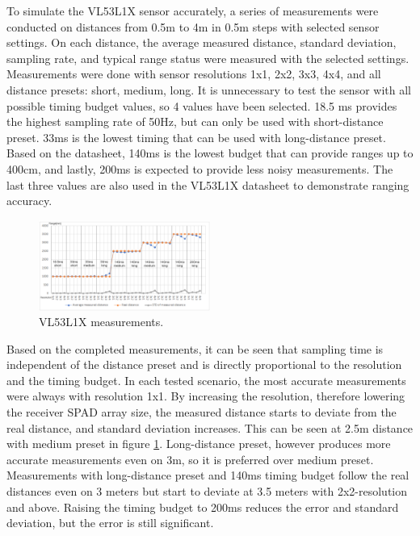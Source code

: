 \documentclass[conference]{IEEEtran}
\begin{document}
To simulate the VL53L1X sensor accurately, a series of measurements were conducted on distances from 0.5m to 4m
in 0.5m steps with selected sensor settings. On each distance, the average measured distance, standard deviation,
sampling rate, and typical range status were measured with the selected settings. Measurements were done with 
sensor resolutions 1x1, 2x2, 3x3, 4x4, and all distance presets: short, medium, long. It is unnecessary to test
the sensor with all possible timing budget values, so 4 values have been selected.
18.5 ms provides the highest sampling rate of 50Hz, but can only be used with short-distance preset. 33ms is the 
lowest timing that can be used with long-distance preset. Based on the datasheet, 140ms is the lowest budget that
can provide ranges up to 400cm, and lastly, 200ms is expected to provide less noisy measurements.
The last three values are also used in the VL53L1X datasheet\cite{VL53L1XDatasheet} to demonstrate ranging 
accuracy. 
\begin{figure}[!t]
\centering
\includegraphics[width=0.5\textwidth]{vl53l1x_measurements_opmodes.png}
\caption{VL53L1X measurements.}
\label{fig_measurements}
\end{figure}

Based on the completed measurements, it can be seen that sampling time is independent of the distance preset 
and is directly proportional to the resolution and the timing budget. In each tested 
scenario, the most accurate measurements were always with resolution 1x1. By increasing the resolution, therefore
lowering the receiver SPAD array size, the measured distance starts to deviate from the real distance, and 
standard deviation increases. This can be seen at 2.5m distance with medium preset in figure \ref{fig_measurements}. Long-distance preset, 
however produces more accurate measurements even on 3m, so it is preferred over medium preset. Measurements 
with long-distance preset and 140ms timing budget follow the real distances even on 3 meters but start to 
deviate at 3.5 meters with 2x2-resolution and above. Raising the timing budget to 200ms reduces the error 
and standard deviation, but the error is still significant.
\end{document}
